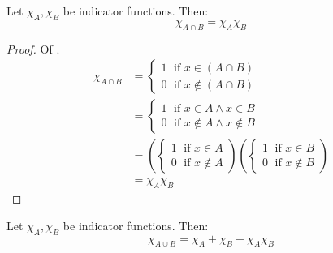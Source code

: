\begin{thm}\label{thm-cap-indicator-function}
    Let $\chi_A,\chi_B$ be indicator functions. Then:
    \begin{equation*}
        \chi_{A \cap B} = \chi_A\chi_B
    \end{equation*}
\end{thm}

\begin{proof}
    Of .
    \begin{align*}
        \chi_{A \cap B} &= \begin{cases}
            1\;\text{ if } x \in (A \cap B)\\
            0\;\text{ if } x \notin (A \cap B)
        \end{cases}\\
        &= \begin{cases}
            1\;\text{ if } x \in A \land x \in B\\
            0\;\text{ if } x \notin A \land x \notin B
        \end{cases}\\
        &= \left(\begin{cases}
            1\;\text{ if } x \in A\\
            0\;\text{ if } x \notin A
        \end{cases}\right)\left(\begin{cases}
            1\;\text{ if } x \in B\\
            0\;\text{ if } x \notin B
        \end{cases}\right)\\
        &= \chi_A\chi_B
    \end{align*}
\end{proof}

\begin{thm}\label{thm-cup-indicator-function}
    Let $\chi_A,\chi_B$ be indicator functions. Then:
    \begin{equation*}
        \chi_{A \cup B} = \chi_A + \chi_B - \chi_A\chi_B
    \end{equation*}
\end{thm}

